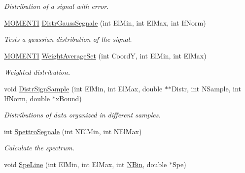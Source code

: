 \begin{DoxyCompactItemize}
\begin{DoxyCompactList}\small\item\em Distribution of a signal with error. \end{DoxyCompactList}\item 
\hyperlink{structMOMENTI}{M\+O\+M\+E\+N\+TI} \hyperlink{classVarDatFile_ac5e7b70f512f6a7a4dd83e942a65537a}{Distr\+Gauss\+Segnale} (int El\+Min, int El\+Max, int If\+Norm)\hypertarget{classVarDatFile_ac5e7b70f512f6a7a4dd83e942a65537a}{}\label{classVarDatFile_ac5e7b70f512f6a7a4dd83e942a65537a}

\begin{DoxyCompactList}\small\item\em Tests a gaussian distribution of the signal. \end{DoxyCompactList}\item 
\hyperlink{structMOMENTI}{M\+O\+M\+E\+N\+TI} \hyperlink{classVarDatFile_acc46e4201d7bdf288601a253bd569ed0}{Weight\+Average\+Set} (int CoordY, int El\+Min, int El\+Max)\hypertarget{classVarDatFile_acc46e4201d7bdf288601a253bd569ed0}{}\label{classVarDatFile_acc46e4201d7bdf288601a253bd569ed0}

\begin{DoxyCompactList}\small\item\em Weighted distribution. \end{DoxyCompactList}\item 
void \hyperlink{classVarDatFile_ab0b5ef5ddc23685148eda453b09ba2f5}{Distr\+Sign\+Sample} (int El\+Min, int El\+Max, double $\ast$$\ast$Distr, int N\+Sample, int If\+Norm, double $\ast$x\+Bound)\hypertarget{classVarDatFile_ab0b5ef5ddc23685148eda453b09ba2f5}{}\label{classVarDatFile_ab0b5ef5ddc23685148eda453b09ba2f5}

\begin{DoxyCompactList}\small\item\em Distributions of data organized in different samples. \end{DoxyCompactList}\item 
int \hyperlink{classVarDatFile_a1454407975f3283a2786d1f5a30c537f}{Spettro\+Segnale} (int N\+El\+Min, int N\+El\+Max)\hypertarget{classVarDatFile_a1454407975f3283a2786d1f5a30c537f}{}\label{classVarDatFile_a1454407975f3283a2786d1f5a30c537f}

\begin{DoxyCompactList}\small\item\em Calculate the spectrum. \end{DoxyCompactList}\item 
void \hyperlink{classVarDatFile_a3a27fb16efc015da73aeb6d511d87252}{Spe\+Line} (int El\+Min, int El\+Max, int \hyperlink{classVarDatFile_a6a683d7b3c08aafd7a5329b0d293eab6}{N\+Bin}, double $\ast$Spe)\hypertarget{classVarDatFile_a3a27fb16efc015da73aeb6d511d87252}{}\label{classVarDatFile_a3a27fb16efc015da73aeb6d511d87252}


\end{DoxyCompactItemize}
